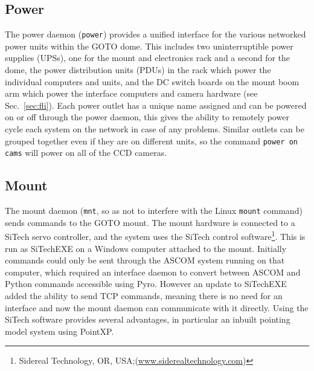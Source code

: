 \begin{colsection}
\begin{colsection}
\end{colsection}


\subsection{Power}
\label{sec:power}
\begin{colsection}

The power daemon (\texttt{power}) provides a unified interface for the various networked power units within the GOTO dome. This includes two uninterruptible power supplies (UPSs), one for the mount and electronics rack and a second for the dome, the power distribution units (PDUs) in the rack which power the individual computers and units, and the DC switch boards on the mount boom arm which power the interface computers and camera hardware (see Sec.~\ref{sec:fli}). Each power outlet has a unique name assigned and can be powered on or off through the power daemon, this gives the ability to remotely power cycle each system on the network in case of any problems. Similar outlets can be grouped together even if they are on different units, so the command \texttt{power on cams} will power on all of the CCD cameras.

\end{colsection}


\subsection{Mount}
\label{sec:mount}
\begin{colsection}

The mount daemon (\texttt{mnt}, so as not to interfere with the Linux \texttt{mount} command) sends commands to the GOTO mount. The mount hardware is connected to a SiTech servo controller, and the system uses the SiTech control software\footnote{Sidereal Technology, OR, USA;\@ (\url{www.siderealtechnology.com})}. This is run as \textsf{SiTechEXE} on a Windows computer attached to the mount. Initially commands could only be sent through the \textsf{ASCOM} system running on that computer, which required an interface daemon to convert between \textsf{ASCOM} and Python commands accessible using \textsf{Pyro}. However an update to \textsf{SiTechEXE} added the ability to send TCP commands, meaning there is no need for an interface and now the mount daemon can communicate with it directly. Using the SiTech software provides several advantages, in particular an inbuilt pointing model system using \textsf{PointXP}.

\end{colsection}


\end{colsection}

